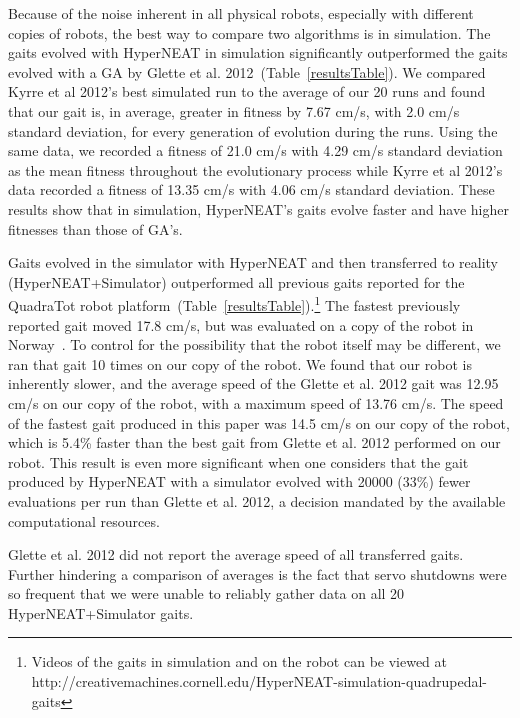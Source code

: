 

Because of the noise inherent in all physical robots, especially with different copies of robots, the best way to compare two algorithms is in simulation. The gaits evolved with HyperNEAT in simulation significantly outperformed the gaits evolved with a GA by Glette et al. 2012~(Table~\ref{resultsTable}). We compared Kyrre et al 2012's best simulated run to the average of our 20 runs and found that our gait is, in average, greater in fitness by 7.67 cm/s, with 2.0 cm/s standard deviation, for every generation of evolution during the runs. Using the same data, we recorded a fitness of 21.0 cm/s with 4.29 cm/s standard deviation as the mean fitness throughout the evolutionary process while Kyrre et al 2012's data recorded a fitness of 13.35 cm/s with 4.06 cm/s standard deviation. These results show that in simulation, HyperNEAT's gaits evolve faster and have higher fitnesses than those of GA's. 

Gaits evolved in the simulator with HyperNEAT and then transferred to reality (HyperNEAT+Simulator) outperformed all previous gaits reported for the QuadraTot robot platform~(Table~\ref{resultsTable}).\footnote{Videos of the gaits in simulation and on the robot can be viewed at http://creativemachines.cornell.edu/HyperNEAT-simulation-quadrupedal-gaits}
The fastest previously reported gait moved 17.8 cm/s, but was evaluated on a copy of the robot in Norway~\cite{glette}. To control for the possibility that the robot itself may be different, we ran that gait 10 times on our copy of the robot. We found that our robot is inherently slower, and the average speed of the Glette et al. 2012 gait was 12.95 cm/s on our copy of the robot, with a maximum speed of 13.76 cm/s.
The speed of the fastest gait produced in this paper was 14.5 cm/s on our copy of the robot, which is 5.4\% faster than the best gait from Glette et al. 2012 performed on our robot. This result is even more significant when one considers that the gait produced by HyperNEAT with a simulator evolved with 20000 (33\%) fewer evaluations per run than Glette et al. 2012, a decision mandated by the available computational resources.   

Glette et al. 2012 did not report the average speed of all transferred gaits. Further hindering a comparison of averages is the fact that servo shutdowns were so frequent that we were unable to reliably gather data on all 20 HyperNEAT+Simulator gaits. 


